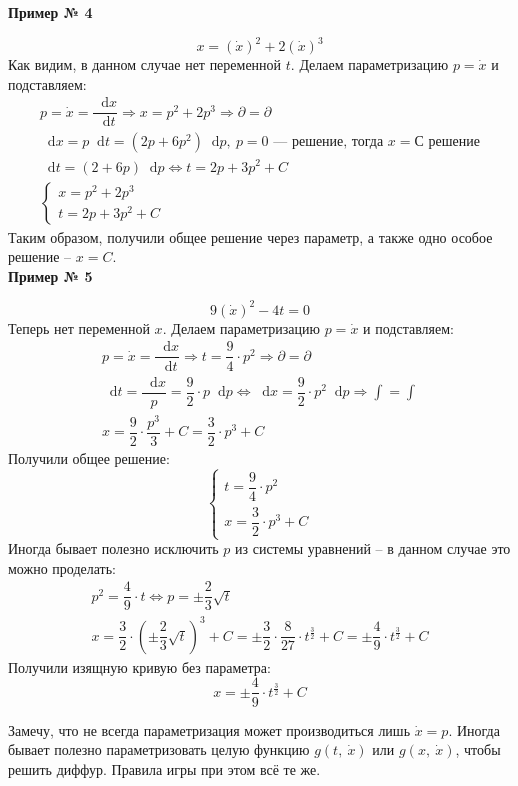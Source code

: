 \documentclass[a4paper,12pt]{article}
\renewcommand*\d{\mathop{}\!\mathrm{d}}
\newcommand{\dx}{\dot{x}}
\newcommand{\bto}{\Longrightarrow}
\newcommand{\ds}{\displaystyle}
\begin{document}
\textbf{Пример № 4}

\[x = (\dx)^2 + 2(\dx)^3\]
Как видим, в данном случае нет переменной $t$. Делаем параметризацию $p = \dx$ и подставляем:
\begin{gather*}
	p = \dx = \dfrac{\d x}{\d t} \bto x = p^2 + 2p^3 \bto \partial = \partial\\
	\d x = p\d t = (2p + 6p^2)\d p,\ p = 0 \text{ --- решение, тогда }x = С \text{ решение}\\
	\d t = (2 + 6p)\d p \iff t = 2p + 3p^2 + C\\
	\begin{cases} x = p^2 + 2p^3\\ t = 2p + 3p^2 + C\end{cases}
\end{gather*}
Таким образом, получили общее решение через параметр, а также одно особое решение -- $x = C$.
\ \\

\textbf{Пример № 5}

\[9(\dx)^2 - 4t = 0\]
Теперь нет переменной $x$. Делаем параметризацию $p = \dx$ и подставляем:
\begin{gather*}
	p = \dx = \dfrac{\d x}{\d t} \bto t = \dfrac{9}{4} \cdot p^2 \bto \partial = \partial\\
	\d t = \dfrac{\d x}{p} = \dfrac{9}{2}\cdot p\d p \iff \d x = \dfrac{9}{2} \cdot p^2\d p \bto \ds\int = \int\\
	x = \dfrac{9}{2} \cdot \dfrac{p^3}{3} + C = \dfrac{3}{2}\cdot p^3 + C
\end{gather*}
Получили общее решение:
\[\begin{cases}
	t = \dfrac{9}{4} \cdot p^2\\
	x = \dfrac{3}{2}\cdot p^3 + C
\end{cases}\]
Иногда бывает полезно исключить $p$ из системы уравнений -- в данном случае это можно проделать:
\begin{gather*}
	p^2 = \dfrac{4}{9}\cdot t \iff p = \pm\dfrac{2}{3}\sqrt{t}\\
	x = \dfrac{3}{2}\cdot \left(\pm\dfrac{2}{3}\sqrt{t}\right)^3 + C = \pm\dfrac{3}{2} \cdot \dfrac{8}{27}\cdot t^{\frac 32} + C = \pm\dfrac{4}{9} \cdot t^{\frac 32} + C
\end{gather*}
Получили изящную кривую без параметра:
\[x = \pm\dfrac{4}{9} \cdot t^{\frac 32} + C\]


Замечу, что не всегда параметризация может производиться лишь $\dx = p$. Иногда бывает полезно параметризовать целую функцию $g(t,\ \dx)$ или $g(x,\ \dx)$, чтобы решить диффур. Правила игры при этом всё те же.
\ \\
\end{document}
